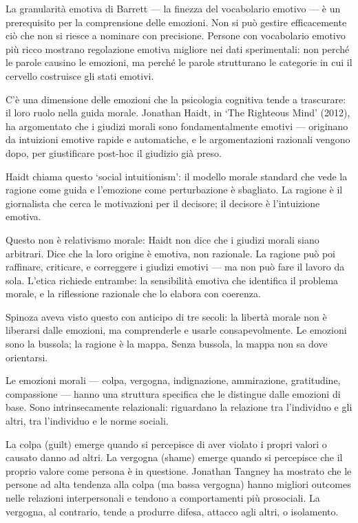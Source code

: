 \documentclass[12pt,a4paper,openany]{book}
\newcommand{\sezione}[1]{\vspace{1.2em}{\large\bfseries #1}\vspace{0.5em}\par}
\begin{document}
La granularità emotiva di Barrett --- la finezza del vocabolario emotivo --- è un prerequisito per la comprensione delle emozioni. Non si può gestire efficacemente ciò che non si riesce a nominare con precisione. Persone con vocabolario emotivo più ricco mostrano regolazione emotiva migliore nei dati sperimentali: non perché le parole causino le emozioni, ma perché le parole strutturano le categorie in cui il cervello costruisce gli stati emotivi.

\sezione{Le emozioni come bussola morale}

C'è una dimensione delle emozioni che la psicologia cognitiva tende a trascurare: il loro ruolo nella guida morale. Jonathan Haidt, in `The Righteous Mind' (2012), ha argomentato che i giudizi morali sono fondamentalmente emotivi --- originano da intuizioni emotive rapide e automatiche, e le argomentazioni razionali vengono dopo, per giustificare post-hoc il giudizio già preso.

Haidt chiama questo `social intuitionism': il modello morale standard che vede la ragione come guida e l'emozione come perturbazione è sbagliato. La ragione è il giornalista che cerca le motivazioni per il decisore; il decisore è l'intuizione emotiva.

Questo non è relativismo morale: Haidt non dice che i giudizi morali siano arbitrari. Dice che la loro origine è emotiva, non razionale. La ragione può poi raffinare, criticare, e correggere i giudizi emotivi --- ma non può fare il lavoro da sola. L'etica richiede entrambe: la sensibilità emotiva che identifica il problema morale, e la riflessione razionale che lo elabora con coerenza.

Spinoza aveva visto questo con anticipo di tre secoli: la libertà morale non è liberarsi dalle emozioni, ma comprenderle e usarle consapevolmente. Le emozioni sono la bussola; la ragione è la mappa. Senza bussola, la mappa non sa dove orientarsi.

\sezione{Emozioni sociali e la struttura morale della mente}

Le emozioni morali --- colpa, vergogna, indignazione, ammirazione, gratitudine, compassione --- hanno una struttura specifica che le distingue dalle emozioni di base. Sono intrinsecamente relazionali: riguardano la relazione tra l'individuo e gli altri, tra l'individuo e le norme sociali.

La colpa (guilt) emerge quando si percepisce di aver violato i propri valori o causato danno ad altri. La vergogna (shame) emerge quando si percepisce che il proprio valore come persona è in questione. Jonathan Tangney ha mostrato che le persone ad alta tendenza alla colpa (ma bassa vergogna) hanno migliori outcomes nelle relazioni interpersonali e tendono a comportamenti più prosociali. La vergogna, al contrario, tende a produrre difesa, attacco agli altri, o isolamento.
\end{document}

